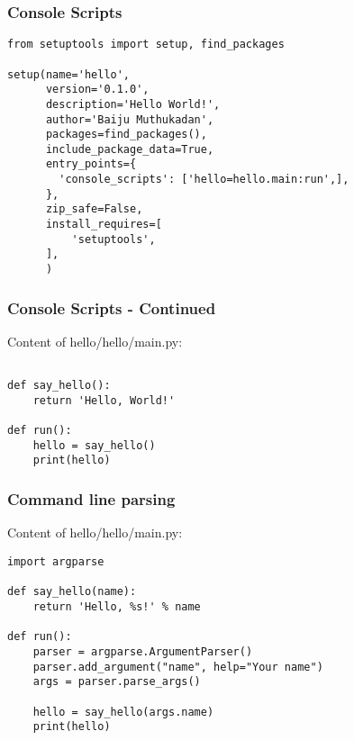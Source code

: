 \documentclass[12pt,handout]{beamer}
\begin{document}
\begin{frame}[fragile]
\frametitle{Console Scripts}

\small{
\begin{verbatim}
from setuptools import setup, find_packages

setup(name='hello',
      version='0.1.0',
      description='Hello World!',
      author='Baiju Muthukadan',
      packages=find_packages(),
      include_package_data=True,
      entry_points={
        'console_scripts': ['hello=hello.main:run',],
      },
      zip_safe=False,
      install_requires=[
          'setuptools',
      ],
      )
\end{verbatim}
}

\end{frame}

\begin{frame}[fragile]
\frametitle{Console Scripts - Continued}

Content of hello/hello/main.py:

\small{
\begin{verbatim}

def say_hello():
    return 'Hello, World!'

def run():
    hello = say_hello()
    print(hello)

\end{verbatim}
}

\end{frame}

\begin{frame}[fragile]
\frametitle{Command line parsing}

Content of hello/hello/main.py:

\small{
\begin{verbatim}
import argparse

def say_hello(name):
    return 'Hello, %s!' % name

def run():
    parser = argparse.ArgumentParser()
    parser.add_argument("name", help="Your name")
    args = parser.parse_args()

    hello = say_hello(args.name)
    print(hello)

\end{verbatim}
}

\end{frame}
\end{document}
